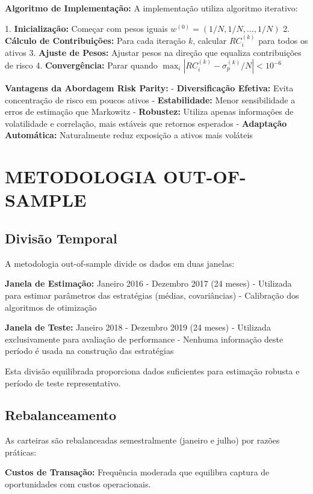 \textbf{Algoritmo de Implementação:} A implementação utiliza algoritmo iterativo:

1. \textbf{Inicialização:} Começar com pesos iguais $w^{(0)} = (1/N, 1/N, ..., 1/N)$
2. \textbf{Cálculo de Contribuições:} Para cada iteração $k$, calcular $RC_i^{(k)}$ para todos os ativos
3. \textbf{Ajuste de Pesos:} Ajustar pesos na direção que equaliza contribuições de risco
4. \textbf{Convergência:} Parar quando $\max_i |RC_i^{(k)} - \sigma_p^{(k)}/N| < 10^{-6}$

\textbf{Vantagens da Abordagem Risk Parity:}
- \textbf{Diversificação Efetiva:} Evita concentração de risco em poucos ativos
- \textbf{Estabilidade:} Menor sensibilidade a erros de estimação que Markowitz
- \textbf{Robustez:} Utiliza apenas informações de volatilidade e correlação, mais estáveis que retornos esperados
- \textbf{Adaptação Automática:} Naturalmente reduz exposição a ativos mais voláteis

\section{METODOLOGIA OUT-OF-SAMPLE}

\subsection{Divisão Temporal}

A metodologia out-of-sample divide os dados em duas janelas:

\textbf{Janela de Estimação:} Janeiro 2016 - Dezembro 2017 (24 meses)
- Utilizada para estimar parâmetros das estratégias (médias, covariâncias)
- Calibração dos algoritmos de otimização

\textbf{Janela de Teste:} Janeiro 2018 - Dezembro 2019 (24 meses)  
- Utilizada exclusivamente para avaliação de performance
- Nenhuma informação deste período é usada na construção das estratégias

Esta divisão equilibrada proporciona dados suficientes para estimação robusta e período de teste representativo.

\subsection{Rebalanceamento}

As carteiras são rebalanceadas semestralmente (janeiro e julho) por razões práticas:

\textbf{Custos de Transação:} Frequência moderada que equilibra captura de oportunidades com custos operacionais.

